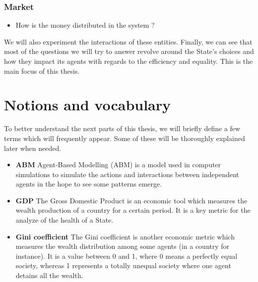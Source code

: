 \subsubsection{Market}

\begin{itemize}
    \item How is the money distributed in the system ? 
\end{itemize}



\noindent We will also experiment the interactions of these entities. Finally, we can see that most of the questions we will try to answer revolve around the State's choices and how they impact its agents with regards to the efficiency and equality. This is the main focus of this thesis.

\section{Notions and vocabulary}
To better understand the next parts of this thesis, we will briefly define a few terms which will frequently appear. Some of these will be thoroughly explained later when needed.

\begin{itemize}
    \item \textbf{ABM} Agent-Based Modelling (ABM) is a model used in computer simulations to simulate the actions and interactions between independent agents in the hope to see some patterns emerge.
    \item \textbf{GDP} The Gross Domestic Product is an economic tool which measures the wealth production of a country for a certain period. It is a key metric for the analyze of the health of a State.
    \item \textbf{Gini coefficient} The Gini coefficient is another economic metric which measures the wealth distribution among some agents (in a country for instance). It is a value between 0 and 1, where 0 means a perfectly equal society, whereas 1 represents a totally unequal society where one agent detains all the wealth.
\end{itemize}
